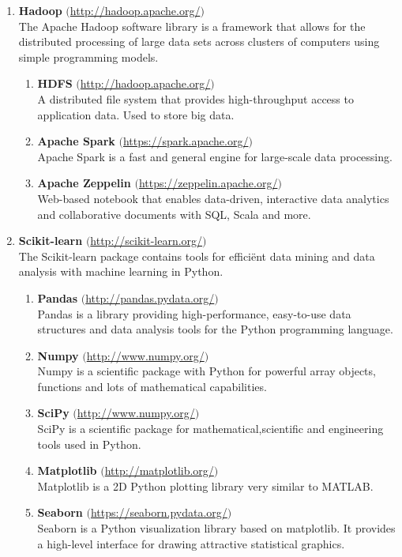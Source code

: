 \begin{enumerate}
    \item \textbf{Hadoop} $($\url{http://hadoop.apache.org/}$)$ \\
    The Apache Hadoop software library is a framework that allows for the distributed processing of large data sets across clusters of computers using simple programming models. 
    \begin{enumerate}
        \item \textbf{HDFS} $($\url{http://hadoop.apache.org/}$)$ \\
        A distributed file system that provides high-throughput access to application data. Used to store big data.
        \item \textbf{Apache Spark} $($\url{https://spark.apache.org/}$)$\\
        Apache Spark is a fast and general engine for large-scale data processing.
        \item \textbf{Apache Zeppelin} $($\url{https://zeppelin.apache.org/}$)$ \\
         Web-based notebook that enables data-driven, interactive data analytics and collaborative documents with SQL, Scala and more.
    \end{enumerate}
    
    \item \textbf{Scikit-learn} $($\url{http://scikit-learn.org/}$)$ \\
    The Scikit-learn package contains tools for effici\"ent data mining and data analysis with machine learning in Python.
    \begin{enumerate}
        \item \textbf{Pandas} $($\url{http://pandas.pydata.org/}$)$ \\
        Pandas is a library providing high-performance, easy-to-use data structures and data analysis tools for the Python programming language.
        \item \textbf{Numpy} $($\url{http://www.numpy.org/}$)$ \\
        Numpy is a scientific package with Python for powerful array objects, functions and lots of mathematical capabilities.
        \item \textbf{SciPy} $($\url{http://www.numpy.org/}$)$ \\
        SciPy is a scientific package for mathematical,scientific and engineering tools used in Python. 
        \item \textbf{Matplotlib} $($\url{http://matplotlib.org/}$)$ \\
        Matplotlib is a 2D Python plotting library very similar to MATLAB.
        \item \textbf{Seaborn} $($\url{https://seaborn.pydata.org/}$)$ \\
        Seaborn is a Python visualization library based on matplotlib. It provides a high-level interface for drawing attractive statistical graphics.
    \end{enumerate}
    

\end{enumerate}
